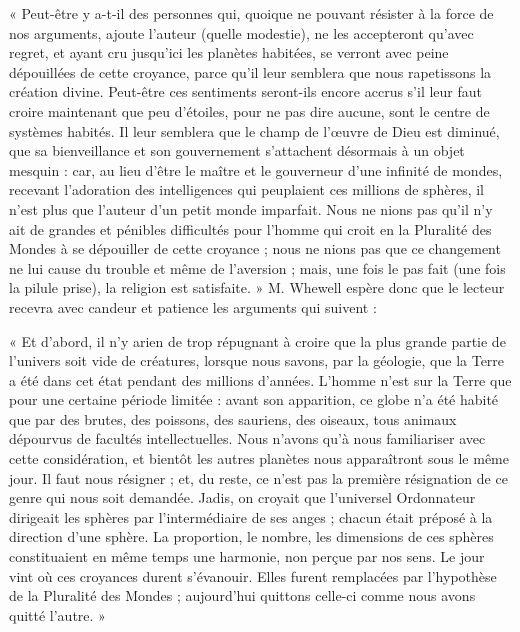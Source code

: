 \documentclass[a4paper, 11pt, oneside, landscape]{article}
\begin{document}
« Peut-être y a-t-il des personnes qui, quoique ne pouvant résister à la force de nos arguments, ajoute l'auteur (quelle modestie), ne les accepteront qu'avec regret, et ayant cru jusqu'ici les planètes habitées, se verront avec peine dépouillées de cette croyance, parce qu'il leur semblera que nous rapetissons la création divine. Peut-être ces sentiments seront-ils encore accrus s'il leur faut croire maintenant que peu d'étoiles, pour ne pas dire aucune, sont le centre de systèmes habités. Il leur semblera que le champ de l'œuvre de Dieu est diminué, que sa bienveillance et son gouvernement s'attachent désormais à un objet mesquin : car, au lieu d'être le maître et le gouverneur d'une infinité de mondes, recevant l'adoration des intelligences qui peuplaient ces millions de sphères, il n'est plus que l'auteur d'un petit monde imparfait. Nous ne nions pas qu'il n'y ait de grandes et pénibles difficultés pour l'homme qui croit en la Pluralité des Mondes à se dépouiller de cette croyance ; nous ne nions pas que ce changement ne lui cause du trouble et même de l'aversion ; mais, une fois le pas fait (une fois la pilule prise), la religion est satisfaite. » M. Whewell espère donc que le lecteur recevra avec candeur et patience les arguments qui suivent :

« Et d'abord, il n'y arien de trop répugnant à croire que la plus grande partie de l'univers soit vide de créatures, lorsque nous savons, par la géologie, que la Terre a été dans cet état pendant des millions d'années. L'homme n'est sur la Terre que pour une certaine période limitée : avant son apparition, ce globe n'a été habité que par des brutes, des poissons, des sauriens, des oiseaux, tous animaux dépourvus de facultés intellectuelles. Nous n'avons qu'à nous familiariser avec cette considération, et bientôt les autres planètes nous apparaîtront sous le même jour. Il faut nous résigner ; et, du reste, ce n'est pas la première résignation de ce genre qui nous soit demandée. Jadis, on croyait que l'universel Ordonnateur dirigeait les sphères par l'intermédiaire de ses anges ; chacun était préposé à la direction d'une sphère. La proportion, le nombre, les dimensions de ces sphères constituaient en même temps une harmonie, non perçue par nos sens. Le jour vint où ces croyances durent s'évanouir. Elles furent remplacées par l'hypothèse de la Pluralité des Mondes ; aujourd'hui quittons celle-ci comme nous avons quitté l'autre. »
\end{document}
